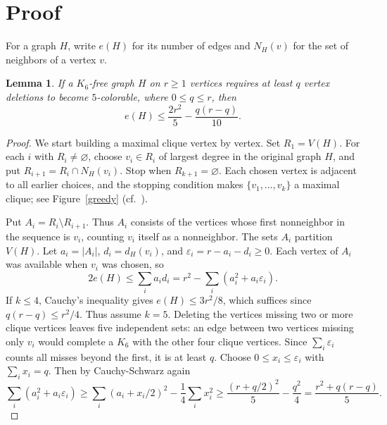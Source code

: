 \documentclass[11pt,a4paper]{amsart}
\newtheorem{lemma}[theorem]{Lemma}
\begin{document}
\section{Proof}

For a graph $H$, write $e(H)$ for its number of edges and $N_H(v)$ for
the set of neighbors of a vertex $v$.


\begin{lemma}\label{graph}
If a $K_6$-free graph $H$ on $r\ge1$ vertices requires at least $q$ vertex deletions
to become $5$-colorable, where $0\le q\le r$, then
\[
             e(H)\le\frac{2r^2}{5}-\frac{q(r-q)}{10}.
\]
\end{lemma}
\begin{proof}
We start building a maximal clique vertex by vertex. Set $R_1=V(H)$.
For each $i$ with $R_i\ne\varnothing$, choose $v_i\in R_i$ of largest
degree in the original graph $H$, and put
$R_{i+1}=R_i\cap N_H(v_i)$.
Stop when $R_{k+1}=\varnothing$. Each chosen vertex is adjacent to all
earlier choices, and the stopping condition makes
$\{v_1,\ldots,v_k\}$ a maximal clique; see Figure~\ref{greedy}
(cf.~\cite[Section~2]{BN}).

Put $A_i=R_i\setminus R_{i+1}$. Thus $A_i$ consists of the vertices
whose first nonneighbor in the sequence is $v_i$, counting $v_i$ itself
as a nonneighbor. The sets $A_i$ partition $V(H)$.
Let $a_i=|A_i|$, $d_i=d_H(v_i)$, and
$\varepsilon_i=r-a_i-d_i\ge0$.
Each vertex of $A_i$ was available when $v_i$ was chosen, so
\[
       2e(H)\le\sum_i a_i d_i
       =r^2-\sum_i(a_i^2+a_i\varepsilon_i).
\]
If $k\le4$, Cauchy's inequality gives $e(H)\le3r^2/8$, which suffices
since $q(r-q)\le r^2/4$. Thus assume $k=5$.
Deleting the vertices missing two or more clique vertices leaves five
independent sets: an edge between two vertices missing only $v_i$ would
complete a $K_6$ with the other four clique vertices. Since
$\sum_i\varepsilon_i$ counts all misses beyond the first, it is at least
$q$. Choose $0\le x_i\le\varepsilon_i$ with $\sum_i x_i=q$. Then by Cauchy-Schwarz again
\[
 \sum_i(a_i^2+a_i\varepsilon_i)
 \ge\sum_i(a_i+x_i/2)^2-\frac14\sum_i x_i^2
 \ge\frac{(r+q/2)^2}{5}-\frac{q^2}{4}
 =\frac{r^2+q(r-q)}5.
\]
\end{proof}
\end{document}
